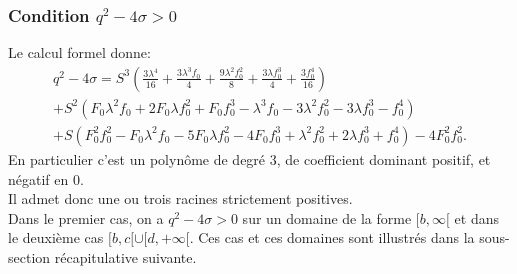 \documentclass[11pt]{article}
\begin{document}
\subsubsection{Condition $q^2 -4\sigma>0$}
Le calcul formel donne:
\begin{multline}
 q^2 - 4\sigma= S^{3}  \left( \frac{3  \lambda^{4}}{16} +  \frac{3  \lambda^{3} f_{0}}{4} +  \frac{9  \lambda^{2} f_{0}^{2}}{8} +  \frac{3  \lambda f_{0}^{3}}{4} +  \frac{3 f_{0}^{4}}{16} \right) \\ + S^{2}  \left(F_{0}  \lambda^{2} f_{0} + 2 F_{0}  \lambda f_{0}^{2} + F_{0} f_{0}^{3} -  \lambda^{3} f_{0} - 3  \lambda^{2} f_{0}^{2} - 3  \lambda f_{0}^{3} - f_{0}^{4} \right) \\+ S  \left(F_{0}^{2} f_{0}^{2} - F_{0}  \lambda^{2} f_{0} - 5 F_{0}  \lambda f_{0}^{2} - 4 F_{0} f_{0}^{3} +  \lambda^{2} f_{0}^{2} + 2  \lambda f_{0}^{3} + f_{0}^{4} \right)- 4 F_{0}^{2} f_{0}^{2} .
\end{multline}
En particulier c'est un polynôme de degré 3, de coefficient dominant positif, et négatif en $0$.\\ Il admet donc une ou trois racines strictement positives. \\ Dans le premier cas, on a $q^2 -4\sigma>0$ sur un domaine de la forme $[b,\infty[$ et dans le deuxième cas $[b,c[\cup [d,+\infty[ $. Ces cas et ces domaines sont illustrés dans la sous-section récapitulative suivante.
\end{document}

